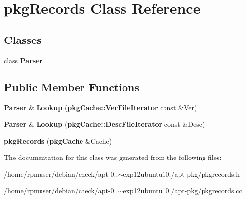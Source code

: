 \section{pkg\-Records \-Class \-Reference}
\label{classpkgRecords}
\subsection*{\-Classes}
\begin{DoxyCompactItemize}
\item 
class {\bf \-Parser}
\end{DoxyCompactItemize}
\subsection*{\-Public \-Member \-Functions}
\begin{DoxyCompactItemize}
\item 
{\bf \-Parser} \& {\bfseries \-Lookup} ({\bf pkg\-Cache\-::\-Ver\-File\-Iterator} const \&\-Ver)\label{classpkgRecords_a820856aa03728bcfe37685766500f5d0}

\item 
{\bf \-Parser} \& {\bfseries \-Lookup} ({\bf pkg\-Cache\-::\-Desc\-File\-Iterator} const \&\-Desc)\label{classpkgRecords_a388488db3d3915992216c488cc17319a}

\item 
{\bfseries pkg\-Records} ({\bf pkg\-Cache} \&\-Cache)\label{classpkgRecords_aba528f04b04ea0170cfd07a8f6f9dfdd}

\end{DoxyCompactItemize}


\-The documentation for this class was generated from the following files\-:\begin{DoxyCompactItemize}
\item 
/home/rpmuser/debian/check/apt-\/0..$\sim$exp12ubuntu10./apt-\/pkg/pkgrecords.\-h\item 
/home/rpmuser/debian/check/apt-\/0..$\sim$exp12ubuntu10./apt-\/pkg/pkgrecords.\-cc\end{DoxyCompactItemize}
